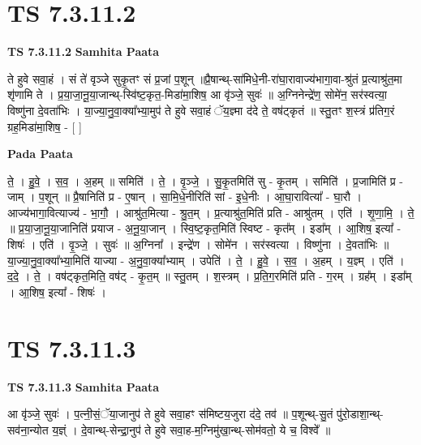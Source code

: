 \documentclass[17pt]{extarticle}
\begin{document}
\section*{ TS 7.3.11.2 }

\textbf{TS 7.3.11.2 } \newline
\textbf{Samhita Paata} \newline

ते हुवे सवा॒हं । सं ते॑ वृञ्जे सुकृ॒तꣳ सं प्र॒जां प॒शून् ॥प्रै॒षान्थ्-सा॑मिधे॒नी-रा॑घा॒रावाज्य॑भागा॒वा-श्रु॑तं प्र॒त्याश्रु॑त॒मा शृ॑णामि ते । प्र॒या॒जा॒नू॒या॒जान्थ्-स्वि॑ष्ट॒कृत॒-मिडा॑मा॒शिष॒ आ वृ॑ञ्जे॒ सुवः॑ ॥ अ॒ग्निनेन्द्रे॑ण॒ सोमे॑न॒ सर॑स्वत्या॒ विष्णु॑ना दे॒वता॑भिः । या॒ज्या॒नु॒वा॒क्या᳚भ्या॒मुप॑ ते हुवे सवा॒हं ॅय॒ज्ञ्मा द॑दे ते॒ वष॑ट्कृतं ॥ स्तु॒तꣳ श॒स्त्रं प्र॑तिग॒रं ग्रह॒मिडा॑मा॒शिष॒ - [  ] \newline

\textbf{Pada Paata} \newline

ते॒ । हु॒वे॒ । स॒व॒ । अ॒हम् ॥ समिति॑ । ते॒ । वृ॒ञ्जे॒ । सु॒कृ॒तमिति॑ सु - कृ॒तम् । समिति॑ । प्र॒जामिति॑ प्र - जाम् । प॒शून् ॥ प्रै॒षानिति॑ प्र - ए॒षान् । सा॒मि॒धे॒नीरिति॑ सां - इ॒धे॒नीः । आ॒घा॒रावित्या᳚ - घा॒रौ । आज्य॑भागा॒वित्याज्य॑ - भा॒गौ॒ । आश्रु॑त॒मित्या - श्रु॒त॒म् । प्र॒त्याश्रु॑त॒मिति॑ प्रति - आश्रु॑तम् । एति॑ । शृ॒णा॒मि॒ । ते॒ ॥ प्र॒या॒जा॒नू॒या॒जानिति॑ प्रयाज - अ॒नू॒या॒जान् । स्वि॒ष्ट॒कृत॒मिति॑ स्विष्ट - कृत᳚म् । इडा᳚म् । आ॒शिष॒ इत्या᳚ - शिषः॑ । एति॑ । वृ॒ञ्जे॒ । सुवः॑ ॥ अ॒ग्निना᳚ । इन्द्रे॑ण । सोमे॑न । सर॑स्वत्या । विष्णु॑ना । दे॒वता॑भिः ॥ या॒ज्या॒नु॒वा॒क्या᳚भ्या॒मिति॑ याज्या - अ॒नु॒वा॒क्या᳚भ्याम् । उपेति॑ । ते॒ । हु॒वे॒ । स॒व॒ । अ॒हम् । य॒ज्ञ्म् । एति॑ । द॒दे॒ । ते॒ । वष॑ट्कृत॒मिति॒ वष॑ट् - कृ॒त॒म् ॥ स्तु॒तम् । श॒स्त्रम् । प्र॒ति॒ग॒रमिति॑ प्रति - ग॒रम् । ग्रह᳚म् । इडा᳚म् । आ॒शिष॒ इत्या᳚ - शिषः॑ ।  \newline




\section*{ TS 7.3.11.3 }

\textbf{TS 7.3.11.3 } \newline
\textbf{Samhita Paata} \newline

आ वृ॑ञ्जे॒ सुवः॑ । प॒त्नी॒सं॒ॅया॒जानुप॑ ते हुवे सवा॒हꣳ स॑मिष्टय॒जुरा द॑दे॒ तव॑ ॥ प॒शून्थ्-सु॒तं पु॑रो॒डाशा॒न्थ्-सव॑ना॒न्योत य॒ज्ञ्ं । दे॒वान्थ्-सेन्द्रा॒नुप॑ ते हुवे सवा॒ह-म॒ग्निमु॑खा॒न्थ्-सोम॑वतो॒ ये च॒ विश्वे᳚ ॥ \newline
\end{document}
